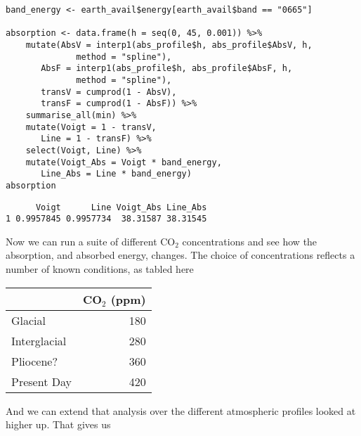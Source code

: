 \documentclass[10pt,a4paper,titlepage]{article}
\begin{document}
\begin{lstlisting}
band_energy <- earth_avail$energy[earth_avail$band == "0665"]

absorption <- data.frame(h = seq(0, 45, 0.001)) %>%
    mutate(AbsV = interp1(abs_profile$h, abs_profile$AbsV, h,
			  method = "spline"),
	   AbsF = interp1(abs_profile$h, abs_profile$AbsF, h,
			  method = "spline"),
	   transV = cumprod(1 - AbsV),
	   transF = cumprod(1 - AbsF)) %>%
    summarise_all(min) %>%
    mutate(Voigt = 1 - transV,
	   Line = 1 - transF) %>%
    select(Voigt, Line) %>%
    mutate(Voigt_Abs = Voigt * band_energy,
	   Line_Abs = Line * band_energy)
absorption
\end{lstlisting}

\begin{verbatim}
      Voigt      Line Voigt_Abs Line_Abs
1 0.9957845 0.9957734  38.31587 38.31545
\end{verbatim}

Now we can run a suite of different CO$_{\text{2}}$ concentrations and see how
the absorption, and absorbed energy, changes. The choice of
concentrations reflects a number of known conditions, as tabled here

\begin{center}
\begin{tabular}{lr}
\toprule
 & CO$_{\text{2}}$ (ppm)\\
\midrule
Glacial & 180\\
Interglacial & 280\\
Pliocene? & 360\\
Present Day & 420\\
\bottomrule
\end{tabular}
\end{center}

And we can extend that analysis over the different atmospheric
profiles looked at higher up. That gives us
\end{document}
